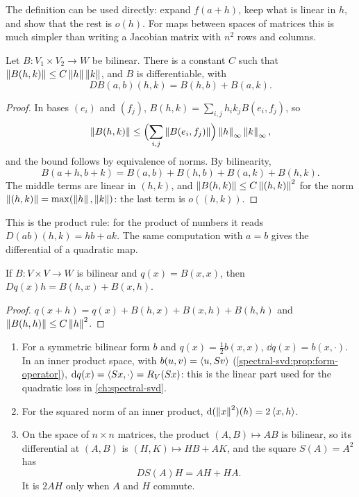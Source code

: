 \begin{notechapter}
The definition can be used directly: expand $f(a + h)$, keep what is
linear in $h$, and show that the rest is $o(h)$. For maps between spaces
of matrices this is much simpler than writing a Jacobian matrix with
$n^2$ rows and columns.

\begin{proposition}\label{differential:prop:bilinear}
Let $B:V_1\times V_2\to W$ be bilinear. There is a constant $C$ such that
$\left\|B(h, k)\right\|\leq C\left\|h\right\|\left\|k\right\|$, and $B$ is differentiable, with
\[
  DB(a, b)(h, k) = B(h, b) + B(a, k) .
\]
\end{proposition}

\begin{proof}
In bases $(e_i)$ and $(f_j)$, $B(h, k) = \sum_{i,j}h_ik_jB(e_i, f_j)$, so
\[
  \left\|B(h, k)\right\|\leq\Bigl(\sum_{i,j}\left\|B(e_i, f_j)\right\|\Bigr)
  \left\|h\right\|_\infty\left\|k\right\|_\infty ,
\]
and the bound follows by equivalence of norms. By bilinearity,
\[
  B(a + h, b + k) = B(a, b) + B(h, b) + B(a, k) + B(h, k) .
\]
The middle terms are linear in $(h, k)$, and
$\left\|B(h, k)\right\|\leq C\left\|(h, k)\right\|^2$ for the norm
$\left\|(h, k)\right\| = \max(\left\|h\right\|, \left\|k\right\|)$: the last term is $o((h, k))$.
\end{proof}

This is the product rule: for the product of numbers it reads
$D(ab)(h, k) = hb + ak$. The same computation with $a = b$ gives the
differential of a quadratic map.

\begin{corollary}\label{differential:cor:quadratic}
If $B:V\times V\to W$ is bilinear and $q(x) = B(x, x)$, then
$Dq(x)h = B(h, x) + B(x, h)$.
\end{corollary}

\begin{proof}
$q(x + h) = q(x) + B(h, x) + B(x, h) + B(h, h)$ and
$\left\|B(h, h)\right\|\leq C\left\|h\right\|^2$.
\end{proof}

\begin{example}\label{differential:ex:quadratic}
\begin{enumerate}[nosep]
  \item For a symmetric bilinear form $b$ and $q(x) = \frac12b(x, x)$,
        $\dd q(x) = b(x, \cdot)$. In an inner product space, with
        $b(u, v) = \left\langle u, Sv \right\rangle$
        (\cref{spectral-svd:prop:form-operator}),
        $\mathrm{d} q(x) = \left\langle Sx, \cdot \right\rangle = R_V(Sx)$: this is the linear part
        used for the quadratic loss in \cref{ch:spectral-svd}.
  \item For the squared norm of an inner product,
        $\mathrm{d}(\left\|x\right\|^2)(h) = 2\left\langle x, h \right\rangle$.
  \item On the space of $n\times n$ matrices, the product
        $(A, B)\mapsto AB$ is bilinear, so its differential at $(A, B)$ is
        $(H, K)\mapsto HB + AK$, and the square $S(A) = A^2$ has
        \[
          DS(A)H = AH + HA .
        \]
        It is $2AH$ only when $A$ and $H$ commute.
\end{enumerate}
\end{example}


\end{notechapter}
